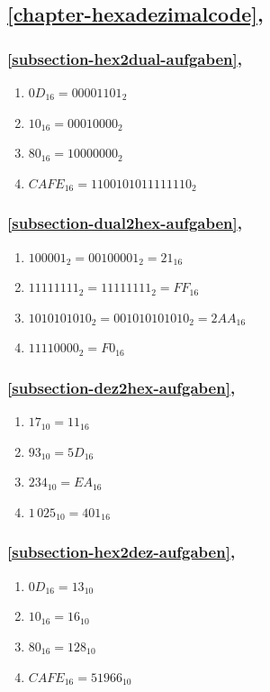 \subsection{\autoref{chapter-hexadezimalcode}, }

\subsubsection{\autoref{subsection-hex2dual-aufgaben}, }

\begin{enumerate}
\item $0D_{16} = 00001101_2$
\item $10_{16} = 00010000_2$
\item $80_{16} = 10000000_2$
\item $CAFE_{16} = 1100101011111110_2$
\end{enumerate}

\subsubsection{\autoref{subsection-dual2hex-aufgaben}, }

\begin{enumerate}
\item $100001_2  = 00100001_2 = 21_{16}$
\item $11111111_2 = 11111111_2 = FF_{16}$
\item $1010101010_2 = 001010101010_2 = 2AA_{16}$
\item $11110000_2 = F0_{16}$
\end{enumerate}

\subsubsection{\autoref{subsection-dez2hex-aufgaben}, }

\begin{enumerate}
\item $17_{10} = 11_{16}$
\item $93_{10} = 5D_{16}$
\item $234_{10} = EA_{16}$
\item $1\,025_{10} = 401_{16}$
\end{enumerate}

\subsubsection{\autoref{subsection-hex2dez-aufgaben}, }

\begin{enumerate}
\item $0D_{16} = \num{13}_{10}$
\item $10_{16} = \num{16}_{10}$
\item $80_{16} = \num{128}_{10}$
\item $CAFE_{16} = \num{51966}_{10}$
\end{enumerate}